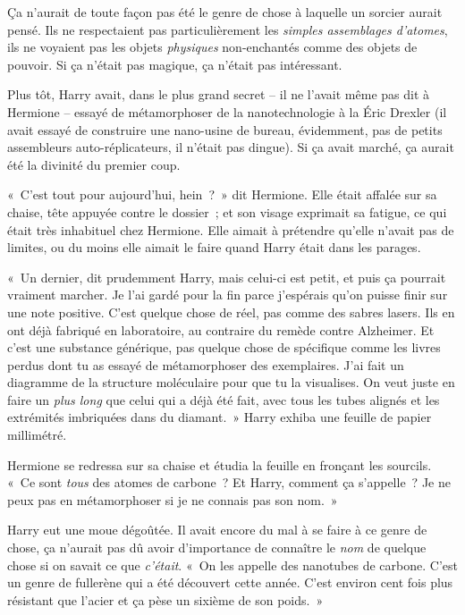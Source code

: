 Ça n'aurait de toute façon pas été le genre de chose à laquelle un sorcier aurait pensé. Ils ne respectaient pas particulièrement les \emph{simples assemblages d'atomes}, ils ne voyaient pas les objets \emph{physiques} non-enchantés comme des objets de pouvoir. Si ça n'était pas magique, ça n'était pas intéressant.

Plus tôt, Harry avait, dans le plus grand secret -- il ne l'avait même pas dit à Hermione -- essayé de métamorphoser de la nanotechnologie à la Éric Drexler (il avait essayé de construire une nano-usine de bureau, évidemment, pas de petits assembleurs auto-réplicateurs, il n'était pas dingue). Si ça avait marché, ça aurait été la divinité du premier coup.

«~C'est tout pour aujourd'hui, hein~?~» dit Hermione. Elle était affalée sur sa chaise, tête appuyée contre le dossier~; et son visage exprimait sa fatigue, ce qui était très inhabituel chez Hermione. Elle aimait à prétendre qu'elle n'avait pas de limites, ou du moins elle aimait le faire quand Harry était dans les parages.

«~Un dernier, dit prudemment Harry, mais celui-ci est petit, et puis ça pourrait vraiment marcher. Je l'ai gardé pour la fin parce j'espérais qu'on puisse finir sur une note positive. C'est quelque chose de réel, pas comme des sabres lasers. Ils en ont déjà fabriqué en laboratoire, au contraire du remède contre Alzheimer. Et c'est une substance générique, pas quelque chose de spécifique comme les livres perdus dont tu as essayé de métamorphoser des exemplaires. J'ai fait un diagramme de la structure moléculaire pour que tu la visualises. On veut juste en faire un \emph{plus long} que celui qui a déjà été fait, avec tous les tubes alignés et les extrémités imbriquées dans du diamant.~» Harry exhiba une feuille de papier millimétré.

Hermione se redressa sur sa chaise et étudia la feuille en fronçant les sourcils. «~Ce sont \emph{tous} des atomes de carbone~? Et Harry, comment ça s'appelle~? Je ne peux pas en métamorphoser si je ne connais pas son nom.~»

Harry eut une moue dégoûtée. Il avait encore du mal à se faire à ce genre de chose, ça n'aurait pas dû avoir d'importance de connaître le \emph{nom} de quelque chose si on savait ce que \emph{c'était}. «~On les appelle des nanotubes de carbone. C'est un genre de fullerène qui a été découvert cette année. C'est environ cent fois plus résistant que l'acier et ça pèse un sixième de son poids.~»

